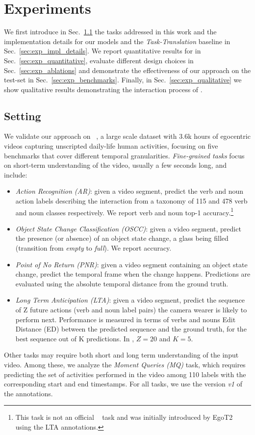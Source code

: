 \section{Experiments}\label{sec:experiments}
We first introduce in Sec.~\ref{sec:exp_setting} the tasks addressed in this work and the implementation details for our models and the \emph{Task-Translation} baseline in Sec.~\ref{sec:exp_impl_details}.
We report quantitative results for \ours in Sec.~\ref{sec:exp_quantitative}, evaluate different design choices in Sec.~\ref{sec:exp_ablations} and demonstrate the effectiveness of our approach on the test-set in Sec.~\ref{sec:exp_benchmarks}.
Finally, in Sec.~\ref{sec:exp_qualitative} we show qualitative results demonstrating the interaction process of \ours.

\subsection{Setting}\label{sec:exp_setting}
We validate our approach on \egofourd~\cite{ego4d}, a large scale dataset with 3.6k hours of egocentric videos capturing unscripted daily-life human activities, focusing on five \egofourd benchmarks that cover different temporal granularities.
\emph{Fine-grained tasks} focus on short-term understanding of the video, usually a few seconds long, and include:
%
\begin{itemize}
    \item \emph{Action Recognition (AR)}: given a video segment, predict the verb and noun action labels describing the interaction from a taxonomy of 115 and 478 verb and noun classes respectively. We report verb and noun top-1 accuracy.\footnote{This task is not an official \egofourd~\cite{ego4d} task and was initially introduced by EgoT2~\cite{egot2} using the LTA annotations.}
    \item \emph{Object State Change Classification (OSCC)}: given a video segment, predict the presence (or absence) of an object state change, \eg a glass being filled (transition from \textit{empty} to \textit{full}). We report accuracy.
    \item \emph{Point of No Return (PNR)}: given a video segment containing an object state change, predict the temporal frame when the change happens. Predictions are evaluated using the absolute temporal distance from the ground truth.
    \item \emph{Long Term Anticipation (LTA)}: given a video segment, predict the sequence of Z future actions (verb and noun label pairs) the camera wearer is likely to perform next. Performance is measured in terms of verbs and nouns Edit Distance (ED) between the predicted sequence and the ground truth, for the best sequence out of K predictions. In \egofourd, $Z=20$ and $K=5$.
\end{itemize}
Other tasks may require both short and long term understanding of the input video.
Among these, we analyze the \emph{Moment Queries (MQ)} task, which requires predicting the set of activities performed in the video among 110 labels with the corresponding start and end timestamps.
For all tasks, we use the version \textit{v1} of the annotations.

